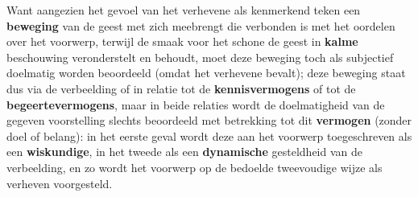 Want aangezien het gevoel van het verhevene als kenmerkend teken een \textbf{beweging} van de geest met zich meebrengt die verbonden is met het oordelen over het voorwerp, terwijl de smaak voor het schone de geest in \textbf{kalme} beschouwing veronderstelt en behoudt, moet deze beweging toch als subjectief doelmatig worden beoordeeld (omdat het verhevene bevalt); deze beweging staat dus via de verbeelding of in relatie tot de \textbf{kennisvermogens} of tot de \textbf{begeertevermogens}, maar in beide relaties wordt de doelmatigheid van de gegeven voorstelling slechts beoordeeld met betrekking tot dit \textbf{vermogen} (zonder doel of belang): in het eerste geval wordt deze aan het voorwerp toegeschreven als een \textbf{wiskundige}, in het tweede als een \textbf{dynamische} gesteldheid van de verbeelding, en zo wordt het voorwerp op de bedoelde tweevoudige wijze als verheven voorgesteld.

